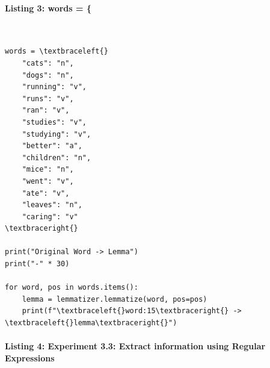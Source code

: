 \documentclass[12pt,a4paper,oneside]{report}
\begin{document}
\paragraph{Listing 3: words = \{}\mbox{}\\[-1ex]
\begin{Verbatim}[commandchars=\\\{\},breaklines=true,breakanywhere=true,fontsize=\scriptsize,frame=leftline,framesep=2mm,rulecolor=\color{gray}]
words = \textbraceleft{}
    "cats": "n",
    "dogs": "n",
    "running": "v",
    "runs": "v",
    "ran": "v",
    "studies": "v",
    "studying": "v",
    "better": "a",
    "children": "n",
    "mice": "n",
    "went": "v",
    "ate": "v",
    "leaves": "n",
    "caring": "v"
\textbraceright{}

print("Original Word -> Lemma")
print("-" * 30)

for word, pos in words.items():
    lemma = lemmatizer.lemmatize(word, pos=pos)
    print(f"\textbraceleft{}word:15\textbraceright{} -> \textbraceleft{}lemma\textbraceright{}")
\end{Verbatim}
\paragraph{Listing 4: Experiment 3.3: Extract information using Regular Expressions}\mbox{}\\[-1ex]
\end{document}
